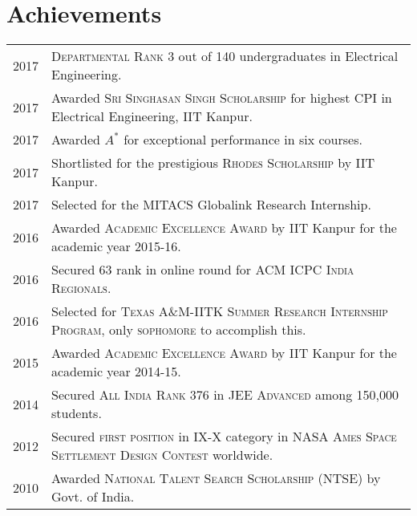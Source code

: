 \documentclass[a4paper,10pt]{article}
\begin{document}
\section{Achievements}
\begin{tabular}{rl}
2017 & \textsc{Departmental Rank 3} out of 140 undergraduates in Electrical
Engineering.\\
2017 & Awarded \textsc{Sri Singhasan Singh Scholarship} for highest CPI in Electrical Engineering, IIT Kanpur.\\
2017 & Awarded $A^*$ for exceptional performance in six courses.\\
2017 & Shortlisted for the  prestigious \textsc{Rhodes Scholarship} by IIT Kanpur.\\
2017 & Selected for the MITACS Globalink Research Internship. \\
2016 & Awarded \textsc{Academic Excellence Award} by IIT Kanpur for the academic year 2015-16.\\
2016 & Secured 63 rank in online round for \textsc{ACM ICPC India Regionals}.\\
2016 & Selected for \textsc{Texas A\&M-IITK Summer Research Internship Program}, only \textsc{sophomore} to accomplish this.\\
2015 & Awarded \textsc{Academic Excellence Award} by IIT Kanpur for the academic year 2014-15.\\
2014 & Secured \textsc{All India Rank 376} in \textsc{JEE Advanced} among 150,000 students.\\
2012 & Secured \textsc{first position} in IX-X category in \textsc{NASA Ames Space Settlement Design Contest} worldwide.\\
2010 & Awarded \textsc{National Talent Search Scholarship} (NTSE) by Govt. of India.

\end{tabular}
\end{document}
